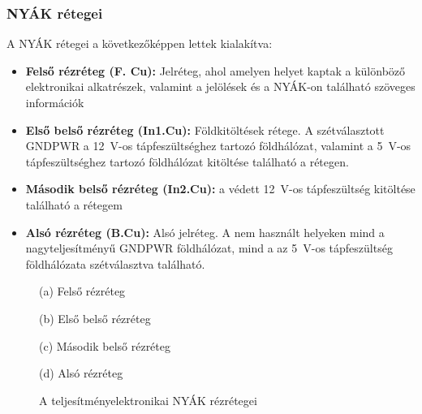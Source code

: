 \subsubsection{NYÁK rétegei}
A NYÁK rétegei a következőképpen lettek kialakítva:
\begin{itemize}
    \item \textbf{Felső rézréteg (F. Cu):} Jelréteg, ahol amelyen helyet kaptak a különböző elektronikai alkatrészek, 
    valamint a jelölések és a NYÁK-on található szöveges információk
    \item \textbf{Első belső rézréteg (In1.Cu):} Földkitöltések rétege. A szétválasztott GNDPWR a 12~V-os tápfeszültséghez tartozó földhálózat, 
    valamint a 5~V-os tápfeszültséghez tartozó földhálózat kitöltése található a rétegen. 
    \item \textbf{Második belső rézréteg (In2.Cu):} a védett 12~V-os tápfeszültség kitöltése található a rétegem 
    \item \textbf{Alsó rézréteg (B.Cu):} Alsó jelréteg. A nem használt helyeken mind a nagyteljesítményű GNDPWR földhálózat, mind a
    az 5~V-os tápfeszültség földhálózata szétválasztva található.
\end{itemize}

\begin{figure}[htbp]
    \centering
    \begin{minipage}{0.48\textwidth}
        \centering
        
        \par\smallskip
        (a) Felső rézréteg
    \end{minipage}
    \hfill
    \begin{minipage}{0.48\textwidth}
        \centering
        
        \par\smallskip
        (b) Első belső rézréteg
    \end{minipage}

    \par\medskip

    \begin{minipage}{0.48\textwidth}
        \centering
        
        \par\smallskip
        (c) Második belső rézréteg
    \end{minipage}
    \hfill
    \begin{minipage}{0.48\textwidth}
        \centering
        
        \par\smallskip
        (d) Alsó rézréteg
    \end{minipage}
    \caption{A teljesítményelektronikai NYÁK rézrétegei}
    \label{fig:teljesitmeny-panel-rezretegek}
\end{figure}

